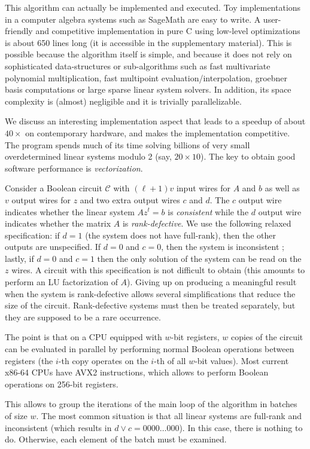 \documentclass[a4paper,UKenglish,cleveref, autoref]{lipics-v2019}
\begin{document}
This algorithm can actually be implemented and executed. Toy implementations in
a computer algebra systems such as \textsf{SageMath} are easy to write. A
user-friendly and competitive implementation in pure C using low-level
optimizations is about 650 lines long (it is accessible in the supplementary
material). This is possible because the algorithm itself is simple, and because
it does not rely on sophisticated data-structures or sub-algorithms such as fast
multivariate polynomial multiplication, fast multipoint
evaluation/interpolation, groebner basis computations or large sparse linear
system solvers. In addition, its space complexity is (almost) negligible and it
is trivially parallelizable.

We discuss an interesting implementation aspect that leads to a speedup of about
$40 \times$ on contemporary hardware, and makes the implementation
competitive. The program spends much of its time solving billions of very small
overdetermined linear systems modulo 2 (say, $20 \times 10$). The key to obtain
good software performance is \emph{vectorization}.

Consider a Boolean circuit $\mathcal{C}$ with $(\ell+1)v$ input wires for $A$
and $b$ as well as $v$ output wires for $z$ and two extra output wires $c$ and
$d$. The $c$ output wire indicates whether the linear system $A z^t = b$ is
\emph{consistent} while the $d$ output wire indicates whether the matrix $A$ is
\emph{rank-defective}. We use the following relaxed specification: if $d=1$ (the
system does not have full-rank), then the other outputs are unspecified. If
$d=0$ and $c=0$, then the system is inconsistent ; lastly, if $d=0$ and $c=1$
then the only solution of the system can be read on the $z$ wires. A circuit
with this specification is not difficult to obtain (this amounts to perform an
LU factorization of $A$). Giving up on producing a meaningful result when the
system is rank-defective allows several simplifications that reduce the size of
the circuit. Rank-defective systems must then be treated separately, but they
are supposed to be a rare occurrence.

The point is that on a CPU equipped with $w$-bit registers, $w$ copies of the
circuit can be evaluated in parallel by performing normal Boolean operations
between registers (the $i$-th copy operates on the $i$-th of all $w$-bit
values). Most current \textsf{x86-64} CPUs have \textsf{AVX2} instructions,
which allows to perform Boolean operations on 256-bit registers.

This allows to group the iterations of the main loop of the algorithm in batches
of size $w$. The most common situation is that all linear systems are full-rank
and inconsistent (which results in $d \vee c = 0000 \dots 000$). In this case,
there is nothing to do. Otherwise, each element of the batch must be examined.
\end{document}
